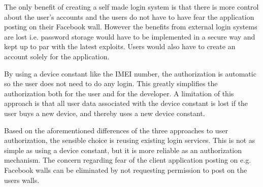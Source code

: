 The only benefit of creating a self made login system is that there is more control about the user's accounts and the users do not have to have fear the application posting on their Facebook wall. However the benefits from external login systems are lost i.e. password storage would have to be implemented in a secure way and kept up to par with the latest exploits. Users would also have to create an account solely for the application.

By using a device constant like the IMEI number, the authorization is automatic so the user does not need to do any login. This greatly simplifies the authorization both for the user and for the developer. A limitation of this approach is that all user data associated with the device constant is lost if the user buys a new device, and thereby uses a new device constant.

Based on the aforementioned differences of the three approaches to user authorization, the sensible choice is reusing existing login services. This is not as simple as using a device constant, but it is more reliable as an authorization mechanism. The concern regarding fear of the client application posting on e.g. Facebook walls can be eliminated by not requesting permission to post on the users walls.
